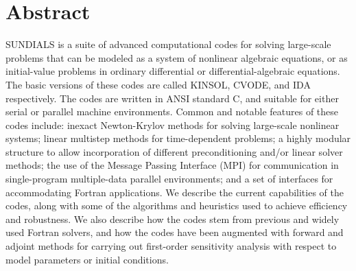 \section*{Abstract}
SUNDIALS is a suite of advanced computational codes for solving
large-scale problems that can be modeled as a system of nonlinear
algebraic equations, or as initial-value problems in ordinary
differential or differential-algebraic equations. The basic versions
of these codes are called KINSOL, CVODE, and IDA respectively. The
codes are written in ANSI standard C, and suitable for either serial
or parallel machine environments.  Common and notable features of
these codes include: inexact Newton-Krylov methods for solving
large-scale nonlinear systems; linear multistep methods for
time-dependent problems; a highly modular structure to allow
incorporation of different preconditioning and/or linear solver
methods; the use of the Message Passing Interface (MPI) for
communication in single-program multiple-data parallel environments;
and a set of interfaces for accommodating Fortran applications.  We
describe the current capabilities of the codes, along with some of the
algorithms and heuristics used to achieve efficiency and robustness.
We also describe how the codes stem from previous and widely used
Fortran solvers, and how the codes have been augmented with forward
and adjoint methods for carrying out first-order sensitivity analysis
with respect to model parameters or initial conditions.
